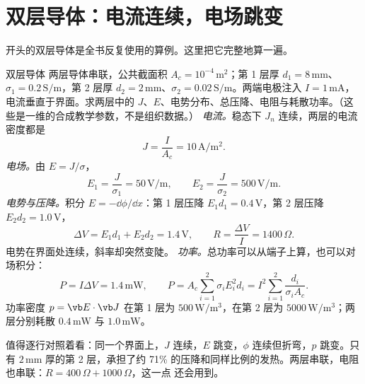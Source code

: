 \section{双层导体：电流连续，电场跳变}\label{sec:interfaces-twolayer}

开头的双层导体是全书反复使用的算例。这里把它完整地算一遍。

\begin{example}{双层导体}\label{ex:twolayer}
两层导体串联，公共截面积 $A_c=10^{-4}\,\mathrm{m^2}$；第 1 层厚 $d_1=8\,\mathrm{mm}$、$\sigma_1=0.2\,\mathrm{S/m}$，第 2 层厚 $d_2=2\,\mathrm{mm}$、$\sigma_2=0.02\,\mathrm{S/m}$。两端电极注入 $I=1\,\mathrm{mA}$，电流垂直于界面。求两层中的 $J$、$E$、电势分布、总压降、电阻与耗散功率。（这些是一维的合成教学参数，不是组织数据。）
\solution
\emph{电流。}稳态下 $J_n$ 连续，两层的电流密度都是
\begin{equation*}
J=\frac{I}{A_c}=10\,\mathrm{A/m^2}.
\end{equation*}
\emph{电场。}由 $E=J/\sigma$，
\begin{equation*}
E_1=\frac{J}{\sigma_1}=50\,\mathrm{V/m},\qquad E_2=\frac{J}{\sigma_2}=500\,\mathrm{V/m}.
\end{equation*}
\emph{电势与压降。}积分 $E=-\dd\phi/\dd x$：第 1 层压降 $E_1d_1=0.4\,\mathrm V$，第 2 层压降 $E_2d_2=1.0\,\mathrm V$，
\begin{equation*}
\Delta V=E_1d_1+E_2d_2=1.4\,\mathrm V,\qquad R=\frac{\Delta V}{I}=1400\,\Omega .
\end{equation*}
电势在界面处连续，斜率却突然变陡。
\emph{功率。}总功率可以从端子上算，也可以对场积分：
\begin{equation*}
P=I\Delta V=1.4\,\mathrm{mW},\qquad P=A_c\sum_{i=1}^2\sigma_iE_i^2d_i=I^2\sum_{i=1}^2\frac{d_i}{\sigma_iA_c}.
\end{equation*}
功率密度 $p=\vb E\cdot\vb J$ 在第 1 层为 $500\,\mathrm{W/m^3}$，在第 2 层为 $5000\,\mathrm{W/m^3}$；两层分别耗散 $0.4\,\mathrm{mW}$ 与 $1.0\,\mathrm{mW}$。
\end{example}


 值得逐行对照着看：同一个界面上，$J$ 连续，$E$ 跳变，$\phi$ 连续但折弯，$p$ 跳变。只有 $2\,\mathrm{mm}$ 厚的第 2 层，承担了约 71\% 的压降和同样比例的发热。两层串联，电阻也串联：$R=400\,\Omega+1000\,\Omega$，这一点 还会用到。

